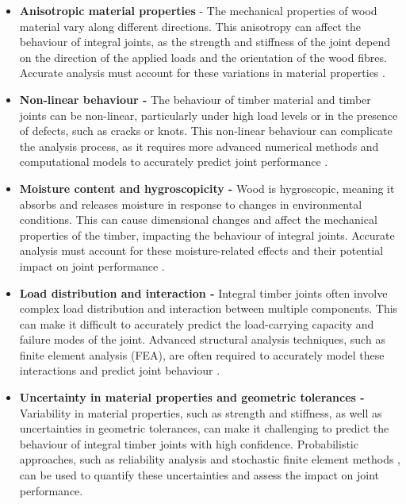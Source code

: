 \begin{itemize}
	\item \textbf{Anisotropic material properties} - The mechanical properties of wood material vary along different directions. This anisotropy can affect the behaviour of integral joints, as the strength and stiffness of the joint depend on the direction of the applied loads and the orientation of the wood fibres. Accurate analysis must account for these variations in material properties \parencite{thelanderssonTimberEngineering2003}.

	\item \textbf{Non-linear behaviour - }The behaviour of timber material and timber joints can be non-linear, particularly under high load levels or in the presence of defects, such as cracks or knots. This non-linear behaviour can complicate the analysis process, as it requires more advanced numerical methods and computational models to accurately predict joint performance \parencite{gustafssonFracturePerpendicularGrain2003, tanadiniAnalysisDesignTimbertotimber2021}.

	\item \textbf{Moisture content and hygroscopicity -} Wood is hygroscopic, meaning it absorbs and releases moisture in response to changes in environmental conditions. This can cause dimensional changes and affect the mechanical properties of the timber, impacting the behaviour of integral joints. Accurate analysis must account for these moisture-related effects and their potential impact on joint performance \parencite{thelanderssonTimberEngineering2003}.

	\item \textbf{Load distribution and interaction -} Integral timber joints often involve complex load distribution and interaction between multiple components. This can make it difficult to accurately predict the load-carrying capacity and failure modes of the joint. Advanced structural analysis techniques, such as finite element analysis (FEA), are often required to accurately model these interactions and predict joint behaviour .

	\item \textbf{Uncertainty in material properties and geometric tolerances -} Variability in material properties, such as strength and stiffness, as well as uncertainties in geometric tolerances, can make it challenging to predict the behaviour of integral timber joints with high confidence. Probabilistic approaches, such as reliability analysis \parencite{ranta-maunusReliabilityAnalysisTimber2001} and stochastic finite element methods \parencite{kandlerStochasticFiniteElement2015}, can be used to quantify these uncertainties and assess the impact on joint performance.

\end{itemize}
